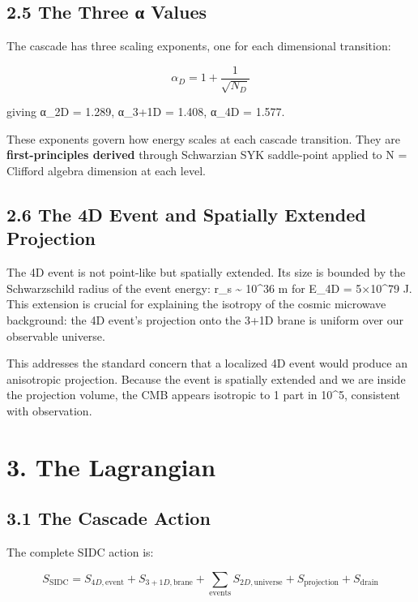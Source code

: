 \documentclass[11pt,a4paper]{article}
\begin{document}
\hypertarget{the-three-ux3b1-values}{%
\subsection{2.5 The Three α Values}\label{the-three-ux3b1-values}}

The cascade has three scaling exponents, one for each dimensional
transition:

\[\alpha_D = 1 + \frac{1}{\sqrt{N_D}}\]

giving α\_2D = 1.289, α\_3+1D = 1.408, α\_4D = 1.577.

These exponents govern how energy scales at each cascade transition.
They are \textbf{first-principles derived} through Schwarzian SYK
saddle-point applied to N = Clifford algebra dimension at each level.

\hypertarget{the-4d-event-and-spatially-extended-projection}{%
\subsection{2.6 The 4D Event and Spatially Extended
Projection}\label{the-4d-event-and-spatially-extended-projection}}

The 4D event is not point-like but spatially extended. Its size is
bounded by the Schwarzschild radius of the event energy: r\_s
\textasciitilde{} 10\^{}36 m for E\_4D = 5×10\^{}79 J. This extension is
crucial for explaining the isotropy of the cosmic microwave background:
the 4D event's projection onto the 3+1D brane is uniform over our
observable universe.

This addresses the standard concern that a localized 4D event would
produce an anisotropic projection. Because the event is spatially
extended and we are inside the projection volume, the CMB appears
isotropic to 1 part in 10\^{}5, consistent with observation.

\hypertarget{the-lagrangian}{%
\section{3. The Lagrangian}\label{the-lagrangian}}

\hypertarget{the-cascade-action}{%
\subsection{3.1 The Cascade Action}\label{the-cascade-action}}

The complete SIDC action is:

\[S_\text{SIDC} = S_{4D,\text{event}} + S_{3+1D,\text{brane}} + \sum_\text{events} S_{2D,\text{universe}} + S_\text{projection} + S_\text{drain}\]
\end{document}
